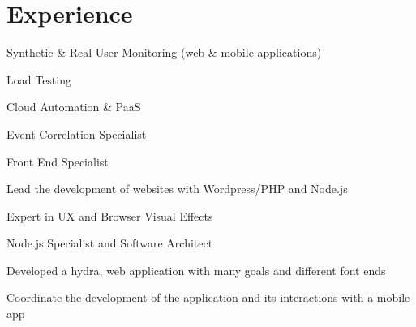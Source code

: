 \documentclass[letterpaper]{deedy-resume} %
\begin{document}
\hfill
%
%
\begin{minipage}[t]{0.66\textwidth} %


\section{Experience}


\vspace{\topsep} %
\begin{tightitemize}
\item Synthetic \& Real User Monitoring (web \& mobile applications)
\item Load Testing
\item Cloud Automation \& PaaS
\item Event Correlation Specialist
\end{tightitemize}

\sectionspace %


\begin{tightitemize}
\item Front End Specialist
\item Lead the development of websites with Wordpress/PHP and Node.js
\item Expert in UX and Browser Visual Effects
\end{tightitemize}

\sectionspace %


\begin{tightitemize}
\item Node.js Specialist and Software Architect
\item Developed a hydra, web application with many goals and different font ends
\item Coordinate the development of the application and its interactions with a mobile app
\end{tightitemize}


\end{minipage}
\end{document}
